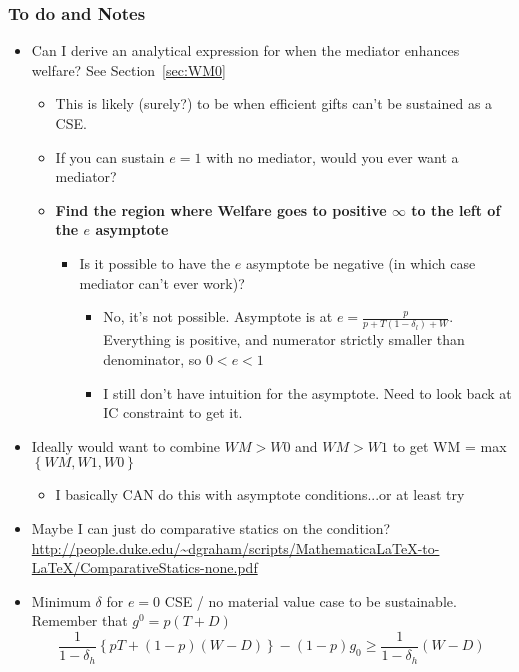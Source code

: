 \documentclass[12pt]{article}
\newcommand{\de}{\delta}
\begin{document}
\subsubsection{To do and Notes}		
	\color{ForestGreen} 
			\begin{itemize}
					\item Can I derive an analytical expression for when the mediator enhances welfare? See Section~\ref{sec:WM0}
						\begin{itemize}
							\item This is likely (surely?) to be when efficient gifts can't be sustained as a CSE.
							\item If you can sustain $e=1$ with no mediator, would you ever want a mediator?
							\item \textbf{Find the region where Welfare goes to positive $\infty$ to the left of the $e$ asymptote}
								\begin{itemize}
									\item Is it possible to have the $e$ asymptote be negative (in which case mediator can't ever work)?
										\begin{itemize}
											\item No, it's not possible. Asymptote is at $e=\frac{p}{p + T(1-\de_l) +W}$. Everything is positive, and numerator strictly smaller than denominator, so $0 < e < 1$
											\item I still don't have intuition for the asymptote. Need to look back at IC constraint to get it.
										\end{itemize}
								\end{itemize}
						\end{itemize}
					\item Ideally would want to combine $WM > W0$ and $WM > W1$ to get WM = max$\left\{WM, W1,W0\right\}$
						\begin{itemize}
							\item I basically CAN do this with asymptote conditions...or at least try
						\end{itemize}
					\item Maybe I can just do comparative statics on the condition? \url{http://people.duke.edu/~dgraham/scripts/MathematicaLaTeX-to-LaTeX/ComparativeStatics-none.pdf}
					\item Minimum $\de$ for $e=0$ CSE / no material value case to be sustainable. Remember that $g^0 = p(T+D)$
						\[
						  \frac{1}{1-\de_h}\left\{pT + (1-p)(W-D)\right\} - (1-p)g_0 \geq \frac{1}{1-\de_h} (W-D)
						\]

\end{itemize}
\end{document}
